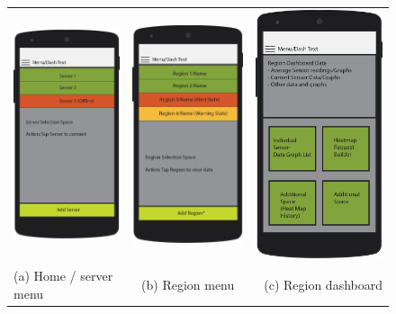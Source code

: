 \documentclass{article}
\begin{document}
\begin{figure}[!htbp]
\begin{center}
\begin{tabular}{l c r}
\includegraphics[width=0.25\linewidth]{Images/bare-nexus-5-mockup-screen-home.png}&
\includegraphics[width=0.25\linewidth]{Images/bare-nexus-5-mockup-screen-region.png}&
\includegraphics[width=0.25\linewidth]{Images/bare-nexus-5-mockup-screen-region-dashboard.png}\\
\vspace{0.2in}
(a) Home / server menu & (b) Region menu & (c) Region dashboard\\


\end{tabular}
\end{center}
\end{figure}
\end{document}
